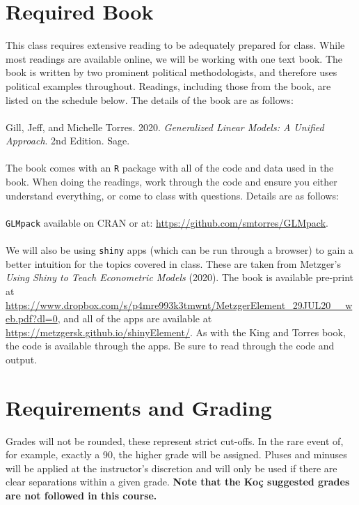 \documentclass[12pt]{article}
\begin{document}
\section*{Required Book}

This class requires extensive reading to be adequately prepared for class. While most readings are available online, we will be working with one text book. The book is written by two prominent political methodologists, and therefore uses political examples throughout. Readings, including those from the book, are listed on the schedule below. The details of the book are as follows:\\\\

\noindent Gill, Jeff, and Michelle Torres. 2020. \emph{Generalized Linear Models: A Unified Approach}. 2nd Edition. Sage.\\\\

\noindent The book comes with an \texttt{R} package with all of the code and data used in the book. When doing the readings, work through the code and ensure you either understand everything, or come to class with questions. Details are as follows:\\\\

\noindent \texttt{GLMpack} available on CRAN or at: \href{https://github.com/smtorres/GLMpack}{https://github.com/smtorres/GLMpack}.\\\\

\noindent We will also be using \texttt{shiny} apps (which can be run through a browser) to gain a better intuition for the topics covered in class. These are taken from Metzger's \emph{Using Shiny to Teach Econometric Models} (2020). The book is available pre-print at \href{https://www.dropbox.com/s/p4mre993k3tmwnt/MetzgerElement_29JUL20__web.pdf?dl=0}{https://www.dropbox.com/s/p4mre993k3tmwnt/MetzgerElement\_29JUL20\_\_web.pdf?dl=0}, and all of the apps are available at \href{https://metzgersk.github.io/shinyElement/}{https://metzgersk.github.io/shinyElement/}. As with the King and Torres book, the code is available through the apps. Be sure to read through the code and output.

\section*{Requirements and Grading}

Grades will not be rounded, these represent strict cut-offs. In the rare event of, for example, exactly a 90, the higher grade will be assigned. Pluses and minuses will be applied at the instructor's discretion and will only be used if there are clear separations within a given grade. \textbf{Note that the Ko\c{c} suggested grades are not followed in this course.}
\end{document}
